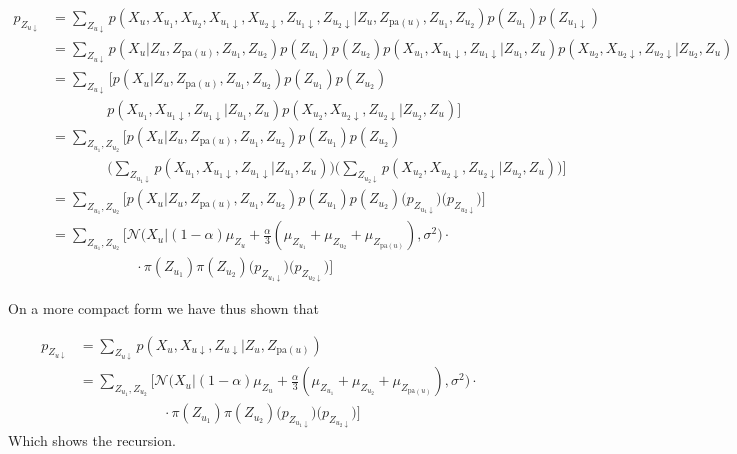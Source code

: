 \begin{align}
  p_{Z_{u \downarrow}} & = \sum_{Z_{u \downarrow}} p(X_u, X_{u_1}, X_{u_2}, X_{u_1 \downarrow}, X_{u_2 \downarrow}, Z_{u_1 \downarrow}, Z_{u_2 \downarrow}|Z_u, Z_{\text{pa}(u)}, Z_{u_1}, Z_{u_2})p(Z_{u_1}) p(Z_{u_1\downarrow}) \nonumber \\
  & = \sum_{Z_{u \downarrow}} p(X_u|Z_u, Z_{\text{pa}(u)}, Z_{u_1}, Z_{u_2}) p(Z_{u_1})p(Z_{u_2})p(X_{u_1}, X_{u_1\downarrow}, Z_{u_1\downarrow}|Z_{u_1}, Z_u) p(X_{u_2}, X_{u_2\downarrow}, Z_{u_2\downarrow}|Z_{u_2}, Z_u) \nonumber\\
  & = \sum_{Z_{u \downarrow}} \bigg[ p(X_u|Z_u, Z_{\text{pa}(u)}, Z_{u_1}, Z_{u_2})p(Z_{u_1})p(Z_{u_2}) \nonumber\\
  & \qquad\qquad p(X_{u_1}, X_{u_1\downarrow}, Z_{u_1\downarrow}|Z_{u_1}, Z_u) p(X_{u_2}, X_{u_2\downarrow}, Z_{u_2\downarrow}|Z_{u_2}, Z_u) \bigg] \nonumber\\
  & = \sum_{Z_{u_1}, Z_{u_2}} \bigg[ p(X_u|Z_u, Z_{\text{pa}(u)}, Z_{u_1}, Z_{u_2})p(Z_{u_1})p(Z_{u_2}) \nonumber\\
  & \qquad\qquad
  \Big( \sum_{Z_{u_1\downarrow}} p(X_{u_1}, X_{u_1\downarrow}, Z_{u_1\downarrow}|Z_{u_1}, Z_u) \Big)
  \Big( \sum_{Z_{u_2\downarrow}} p(X_{u_2}, X_{u_2\downarrow}, Z_{u_2\downarrow}|Z_{u_2}, Z_u)\Big) \bigg] \nonumber\\
  & = \sum_{Z_{u_1}, Z_{u_2}} \bigg[ p(X_u|Z_u, Z_{\text{pa}(u)}, Z_{u_1}, Z_{u_2})p(Z_{u_1})p(Z_{u_2}) \Big(p_{Z_{u_1\downarrow}}\Big) \Big( p_{Z_{u_2\downarrow}}\Big)\bigg] \nonumber \\
  & = \sum_{Z_{u_1}, Z_{u_2}} \bigg[ \mathcal{N}\Big(X_u|(1-\alpha)\mu_{Z_u} +\frac{\alpha}{3}(\mu_{Z_{u_1}}+\mu_{Z_{u_2}}+\mu_{Z_{\text{pa}(u)}}), \sigma^2 \Big) \cdot \nonumber\\
  & \qquad\qquad\qquad  \cdot \pi(Z_{u_1}) \pi(Z_{u_2}) \Big(p_{Z_{u_1\downarrow}}\Big) \Big( p_{Z_{u_2\downarrow}}\Big)\bigg]\nonumber
\end{align}

On a more compact form we have thus shown that

\begin{align}
  p_{Z_{u \downarrow}} & = \sum_{Z_{u \downarrow}} p(X_u, X_{u \downarrow}, Z_{u \downarrow}|Z_u, Z_{\text{pa}(u)}) \\
  & = \sum_{Z_{u_1}, Z_{u_2}} \bigg[ \mathcal{N}\Big(X_u|(1-\alpha)\mu_{Z_u} +\frac{\alpha}{3}(\mu_{Z_{u_1}}+\mu_{Z_{u_2}}+\mu_{Z_{\text{pa}(u)}}), \sigma^2 \Big) \cdot \label{rec1}\\
  & \qquad\qquad\qquad  \cdot \pi(Z_{u_1}) \pi(Z_{u_2}) \Big(p_{Z_{u_1\downarrow}}\Big) \Big( p_{Z_{u_2\downarrow}}\Big)\bigg] \label{rec2}
\end{align}
Which shows the recursion.


